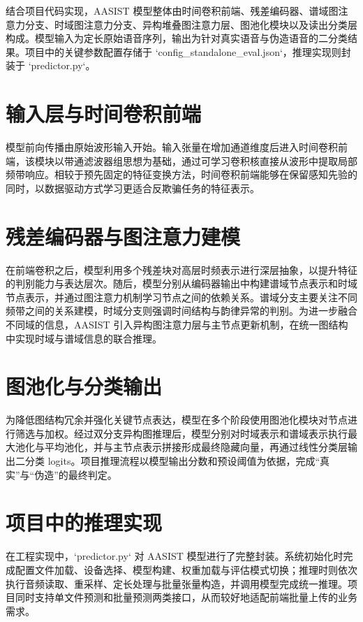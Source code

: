 \documentclass{xduugthesis}
\begin{document}
结合项目代码实现，AASIST 模型整体由时间卷积前端、残差编码器、谱域图注意力分支、时域图注意力分支、异构堆叠图注意力层、图池化模块以及读出分类层构成。模型输入为定长原始语音序列，输出为针对真实语音与伪造语音的二分类结果。项目中的关键参数配置存储于 `config_standalone_eval.json`，推理实现则封装于 `predictor.py`。

\section{输入层与时间卷积前端}

模型前向传播由原始波形输入开始。输入张量在增加通道维度后进入时间卷积前端，该模块以带通滤波器组思想为基础，通过可学习卷积核直接从波形中提取局部频带响应。相较于预先固定的特征变换方法，时间卷积前端能够在保留感知先验的同时，以数据驱动方式学习更适合反欺骗任务的特征表示。

\section{残差编码器与图注意力建模}

在前端卷积之后，模型利用多个残差块对高层时频表示进行深层抽象，以提升特征的判别能力与表达层次。随后，模型分别从编码器输出中构建谱域节点表示和时域节点表示，并通过图注意力机制学习节点之间的依赖关系。谱域分支主要关注不同频带之间的关系建模，时域分支则强调时间结构与韵律异常的判别。为进一步融合不同域的信息，AASIST 引入异构图注意力层与主节点更新机制，在统一图结构中实现时域与谱域信息的联合推理\cite{jung2022aasist,velickovic2018,wang2019han}。

\section{图池化与分类输出}

为降低图结构冗余并强化关键节点表达，模型在多个阶段使用图池化模块对节点进行筛选与加权。经过双分支异构图推理后，模型分别对时域表示和谱域表示执行最大池化与平均池化，并与主节点表示拼接形成最终隐藏向量，再通过线性分类层输出二分类 logits。项目推理流程以模型输出分数和预设阈值为依据，完成“真实”与“伪造”的最终判定。

\section{项目中的推理实现}

在工程实现中，`predictor.py` 对 AASIST 模型进行了完整封装。系统初始化时完成配置文件加载、设备选择、模型构建、权重加载与评估模式切换；推理时则依次执行音频读取、重采样、定长处理与批量张量构造，并调用模型完成统一推理。项目同时支持单文件预测和批量预测两类接口，从而较好地适配前端批量上传的业务需求。
\end{document}
